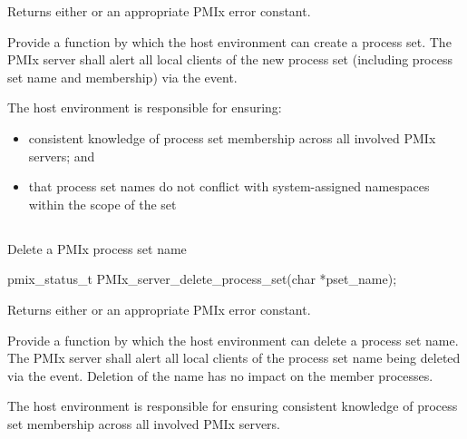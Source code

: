 Returns either  or an appropriate \ac{PMIx} error constant.


\descr

Provide a function by which the host environment can create a process set. The
\ac{PMIx} server shall alert all local clients of the new process set
(including process set name and membership) via the
 event.

\advicermstart
The host environment is responsible for ensuring:

\begin{itemize}
    \item consistent knowledge of process set membership across all involved
    \ac{PMIx} servers; and
    \item that process set names do not conflict with system-assigned
    namespaces within the scope of the set
\end{itemize}

\advicermend

\subsection{}

\summary

Delete a \ac{PMIx} process set name

\format

\cspecificstart
\begin{codepar}
pmix_status_t
PMIx_server_delete_process_set(char *pset_name);
\end{codepar}
\cspecificend

\begin{arglist}
\end{arglist}

Returns either  or an appropriate \ac{PMIx} error
constant.


\descr

Provide a function by which the host environment can delete a process set name.
The \ac{PMIx} server shall alert all local clients of the process set name
being deleted via the  event. Deletion of the name has no impact on the member processes.

\advicermstart
The host environment is responsible for ensuring consistent knowledge of
process set membership across all involved \ac{PMIx} servers.
\advicermend


